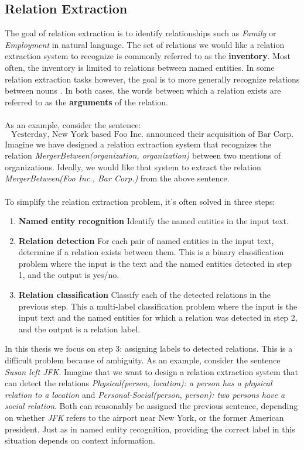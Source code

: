 \subsection{Relation Extraction}
\label{relation_extract}
The goal of relation extraction is to identify relationships such as \textit{Family} or \textit{Employment} in natural language. The set of relations we would like a relation extraction system to recognize is commonly referred to as the \textbf{inventory}. Most often, the inventory is limited to relations between named entities. In some relation extraction tasks however, the goal is to more generally recognize relations between nouns \citep{hendrickx2009}. In both cases, the words between which a relation exists are referred to as the \textbf{arguments} of the relation.
\\\\
As an example, consider the sentence: 
$$
\text{Yesterday, New York based Foo Inc. announced their acquisition of Bar Corp.}
$$ 
Imagine we have designed a relation extraction system that recognizes the relation \textit{MergerBetween(organization, organization)} between two mentions of organizations. Ideally, we would like that system to extract the relation \textit{MergerBetween(Foo Inc., Bar Corp.)} from the above sentence.
\\\\
To simplify the relation extraction problem, it's often solved in three steps:
\begin{enumerate}
	\item \textbf{Named entity recognition} \enspace Identify the named entities in the input text.
	\item \textbf{Relation detection} \enspace For each pair of named entities in the input text, determine if a relation exists between them. This is a binary classification problem where the input is the text and the named entities detected in step 1, and the output is yes/no.
	\item \textbf{Relation classification} \enspace Classify each of the detected relations in the previous step. This a multi-label classification problem where the input is the input text and the named entities for which a relation was detected in step 2, and the output is a relation label.
\end{enumerate}
In this thesis we focus on step 3: assigning labels to detected relations. This is a difficult problem because of ambiguity. As an example, consider the sentence \textit{Susan left JFK}. Imagine that we want to design a relation extraction system that can detect the relations \textit{Physical(person, location): a person has a physical relation to a location} and \textit{Personal-Social(person, person): two persons have a social relation}. Both can reasonably be assigned the previous sentence, depending on whether \textit{JFK} refers to the airport near New York, or the former American president. Just as in named entity recognition, providing the correct label in this situation depends on context information.
